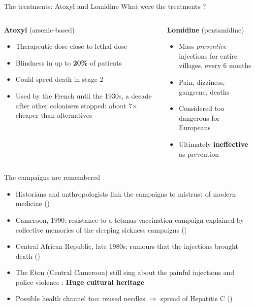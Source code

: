 \documentclass[aspectratio=1610]{beamer}
\newcommand{\highlight}[1]{\textcolor{accent}{\textbf{#1}}}
\newcommand{\refs}[1]{{\footnotesize\color{softgray}(\citealp{#1})}} %
\newcommand{\backupbutton}[2]{\hyperlink{#1}{\beamergotobutton{#2}}}
\begin{document}
\begin{frame}{The treatments: Atoxyl and Lomidine}
\centering
What were the treatments ?
  \begin{columns}[T]
    \begin{column}{0.48\textwidth}
      \textbf{Atoxyl} (arsenic-based)
      \begin{itemize}
        \item Therapeutic dose close to lethal dose
        \item Blindness in up to \highlight{20\%} of patients
        \item Could speed death in stage 2
        \item Used by the French until the 1930s, a decade after other colonisers stopped:
          about 7$\times$ cheaper than alternatives
      \end{itemize}
    \end{column}
    \begin{column}{0.48\textwidth}
      \textbf{Lomidine} (pentamidine)
      \begin{itemize}
        \item Mass \emph{preventive} injections for entire villages, every 6 months
        \item Pain, dizziness, gangrene, deaths
        \item Considered too dangerous for Europeans
        \item Ultimately \highlight{ineffective} as prevention
      \end{itemize}
    \end{column}
  \end{columns}
\end{frame}

\begin{frame}[label=main-memory]{The campaigns are remembered}
  \begin{itemize}
    \item Historians and anthropologists link the campaigns to mistrust of modern medicine
      \refs{headrick_1994,lachenal_2014}
    \item Cameroon, 1990: resistance to a tetanus vaccination campaign explained by
      collective memories of the sleeping sickness campaigns \refs{feldman_etal_2000}
    \item Central African Republic, late 1980s: rumours that the injections brought death
      \refs{giles_vernick_2002}
    \item The Eton (Central Cameroon) still sing about the painful injections and police violence : \textbf{Huge cultural heritage}
    \item Possible health channel too: reused needles $\Rightarrow$ spread of Hepatitis C
      \refs{pepin_2011} \backupbutton{bk-iatrogenic}{Details}
  \end{itemize}
\end{frame}
\end{document}
